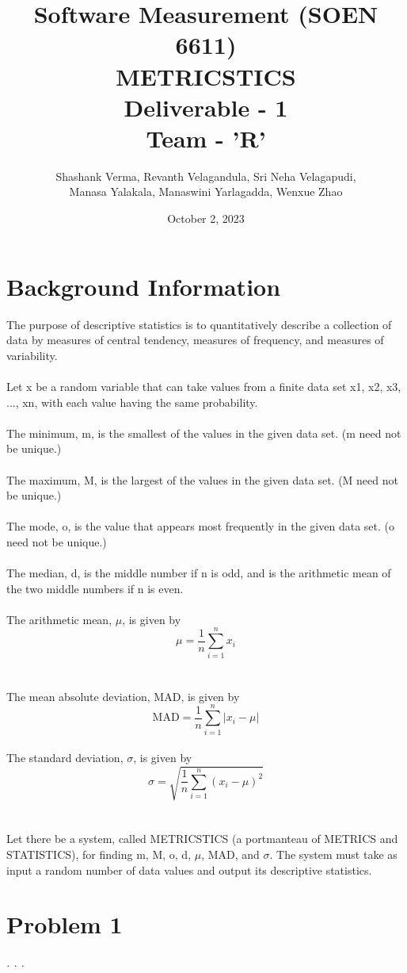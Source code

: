 \documentclass[letterpaper]{report}
\title{Software Measurement (SOEN 6611)\\[.5em]
METRICSTICS\\[.5em]
Deliverable - 1\\[.5em]
Team - 'R'\\[.5em]}
\author{Shashank Verma, Revanth Velagandula, Sri Neha Velagapudi, \\[.5em]
Manasa Yalakala, Manaswini Yarlagadda, Wenxue Zhao\\[.5em]}
\date{October 2, 2023\\[.5em]}
\begin{document}
\maketitle

\tableofcontents




\listoffigures{}


\chapter{Background Information}

The purpose of descriptive statistics is to quantitatively describe a collection of data by measures of central tendency, measures of frequency, and measures of variability. \\
\\Let x be a random variable that can take values from a finite data set x1, x2, x3, ..., xn, with each value having the same probability. \\
\\The minimum, m, is the smallest of the values in the given data set. (m need not be unique.)\\
\\The maximum, M, is the largest of the values in the given data set. (M need not be unique.)\\
\\The mode, o, is the value that appears most frequently in the given data set. (o need not be unique.)\\
\\The median, d, is the middle number if n is odd, and is the arithmetic mean of the two middle numbers if n is even.\\
%
%
\\The arithmetic mean, $\mu$, is given by
\[ \mu = \frac{1}{n} \sum_{i=1}^{n} x_i \]\\
%
%
\\The mean absolute deviation, MAD, is given by
\[ \text{MAD} = \frac{1}{n} \sum_{i=1}^{n} |x_i - \mu| \]\\
%
%
The standard deviation, $\sigma$, is given by
\[ \sigma = \sqrt{\frac{1}{n}\sum_{i=1}^{n}(x_i - \mu)^2} \]\\
\\Let there be a system, called METRICSTICS (a portmanteau of METRICS and
STATISTICS), for finding m, M, o, d, $\mu$, MAD, and $\sigma$. The system must take as input a random number of data values and output its descriptive statistics. 







\chapter{Problem 1}


\begin{thebibliography}{. . .}

\textit{. . .}

\end{thebibliography}
\end{document}
